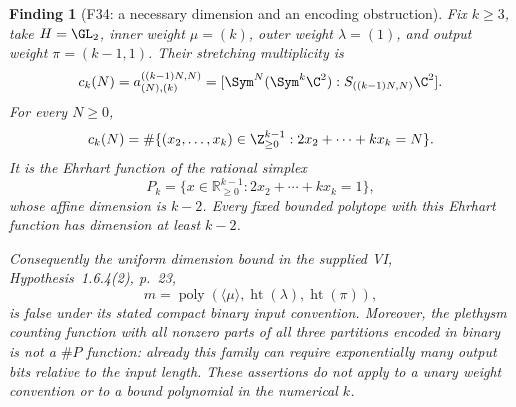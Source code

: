 \documentclass[11pt,a4paper]{article}
\newcommand{\R}{\mathbb R}
\newcommand{\fid}[1]{\textsf{#1}}\newcommand{\gate}[1]{\textsf{#1}}
\theoremstyle{named}\newtheorem{finding}{Finding}[section]
\theoremstyle{definition}\newtheorem{definition}[finding]{Definition}
\theoremstyle{remark}\newtheorem{remark}[finding]{Remark}
\begin{document}
\begin{finding}[\fid{F34}: a necessary dimension and an encoding obstruction]\label{f:binarydimension}
Fix $k\ge3$, take $H=\GL_2$, inner weight $\mu=(k)$,
outer weight $\lambda=(1)$, and output weight $\pi=(k-1,1)$.
Their stretching multiplicity is
\[
 c_k(N)=a^{((k-1)N,N)}_{(N),(k)}
       =[\Sym^N(\Sym^k\C^2):S_{((k-1)N,N)}\C^2].
\]
For every $N\ge0$,
\[
 c_k(N)=
 \#\{(x_2,\ldots,x_k)\in\Z_{\ge0}^{k-1}:
                          2x_2+\cdots+kx_k=N\}.
\]
It is the Ehrhart function of the rational simplex
\[
 P_k=\{x\in\R_{\ge0}^{k-1}:2x_2+\cdots+kx_k=1\},
\]
whose affine dimension is $k-2$. Every fixed bounded polytope with this
Ehrhart function has dimension at least $k-2$.

Consequently the uniform dimension bound in the supplied
VI, Hypothesis~1.6.4(2), p.~23,
\[
 m=\operatorname{poly}
   (\langle\mu\rangle,\operatorname{ht}(\lambda),
                         \operatorname{ht}(\pi)),
\]
is false under its stated compact binary input convention.
Moreover, the plethysm counting function with all nonzero parts of
all three partitions encoded in binary is not a $\#P$ function:
already this family can require exponentially many output bits
relative to the input length.
These assertions do not apply to a unary weight convention or to
a bound polynomial in the numerical $k$.
\end{finding}
\end{document}
